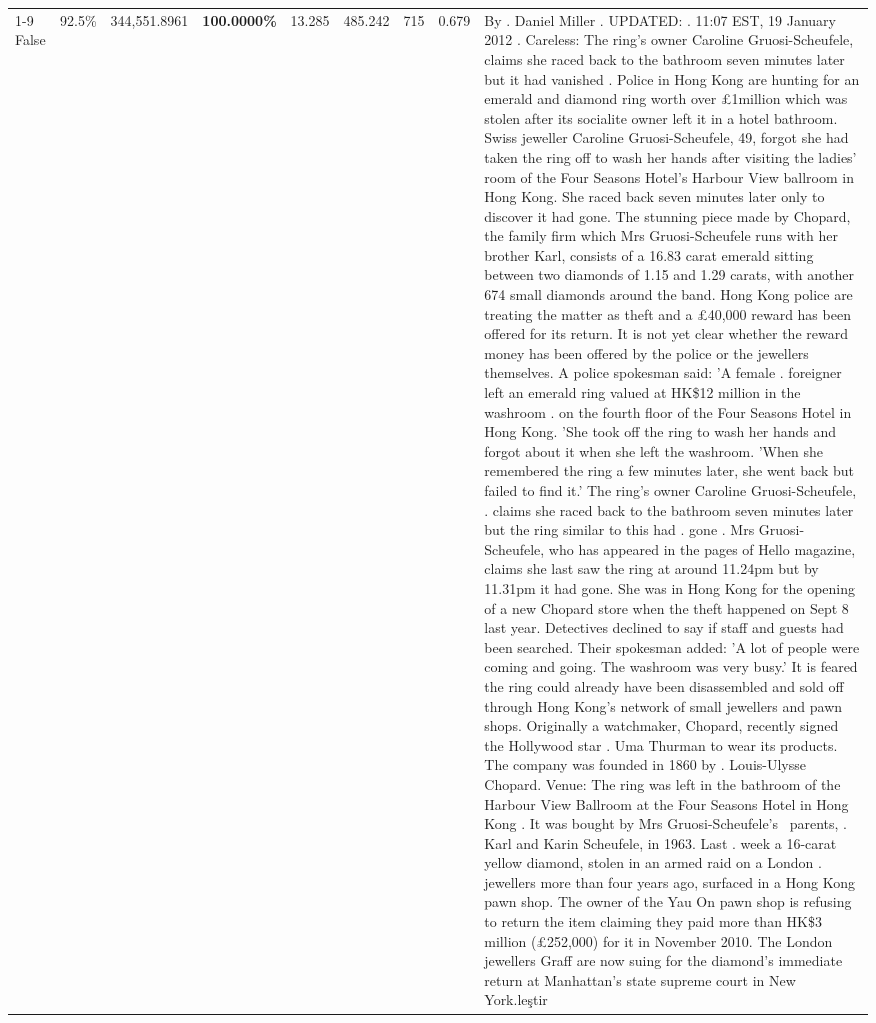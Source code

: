 \begin{table}[H]
\begin{tabular}{lllrlllll}
\cline{1-9}
False & 92.5\% & 344,551.8961 & \bfseries \color{red} 100.0000\% & 13.285 & 485.242 & 715 & 0.679 & By . Daniel Miller . UPDATED: . 11:07 EST, 19 January 2012 . Careless: The ring's owner Caroline Gruosi-Scheufele, claims she raced back to the bathroom seven minutes later but it had vanished . Police in Hong Kong are hunting for an emerald and diamond ring worth over £1million which was stolen after its socialite owner left it in a hotel bathroom. Swiss jeweller Caroline Gruosi-Scheufele, 49, forgot she had taken the ring off to wash her hands after visiting the ladies' room of the Four Seasons Hotel's Harbour View ballroom in Hong Kong. She raced back seven minutes later only to discover it had gone. The stunning piece made by Chopard, the family firm which Mrs Gruosi-Scheufele runs with her brother Karl, consists of a 16.83 carat emerald sitting between two diamonds of 1.15 and 1.29 carats, with another 674 small diamonds around the band. Hong Kong police are treating the matter as theft and a £40,000 reward has been offered for its return. It is not yet clear whether the reward money has been offered by the police or the jewellers themselves. A police spokesman said: 'A female . foreigner left an emerald ring valued at HK\$12 million in the washroom . on the fourth floor of the Four Seasons Hotel in Hong Kong. 'She took off the ring to wash her hands and forgot about it when she left the washroom. 'When she remembered the ring a few minutes later, she went back but failed to find it.' The ring's owner Caroline Gruosi-Scheufele, . claims she raced back to the bathroom seven minutes later but the ring similar to this had . gone . Mrs Gruosi-Scheufele, who has appeared in the pages of Hello magazine, claims she last saw the ring at around 11.24pm but by 11.31pm it had gone. She was in Hong Kong for the opening of a new Chopard store when the theft happened on Sept 8 last year. Detectives declined to say if staff and guests had been searched. Their spokesman added: 'A lot of people were coming and going. The washroom was very busy.' It is feared the ring could already have been disassembled and sold off through Hong Kong's network of small jewellers and pawn shops. Originally a watchmaker, Chopard, recently signed the Hollywood star . Uma Thurman to wear its products. The company was founded in 1860 by . Louis-Ulysse Chopard. Venue: The ring was left in the bathroom of the Harbour View Ballroom at the Four Seasons Hotel in Hong Kong . It was bought by Mrs Gruosi-Scheufele's  parents, . Karl and Karin Scheufele, in 1963. Last . week a 16-carat yellow diamond, stolen in an armed raid on a London . jewellers more than four years ago, surfaced in a Hong Kong pawn shop. The owner of the Yau On pawn shop is refusing to return the item claiming they paid more than HK\$3 million (£252,000) for it in November 2010. The London jewellers Graff are now suing for the diamond’s immediate return at Manhattan’s state supreme court in New York.leştir \\

\end{tabular}
\end{table}
